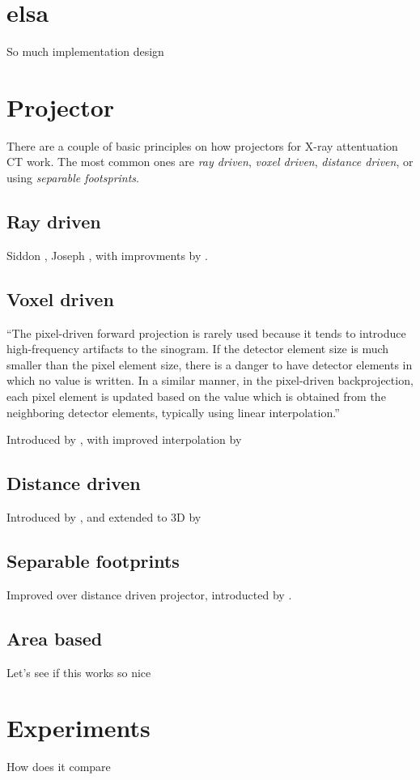 \chapter{elsa}

So much implementation design

\chapter{Projector}

There are a couple of basic principles on how projectors for X-ray attentuation CT work.
The most common ones are \textit{ray driven}, \textit{voxel driven}, \textit{distance driven},
or using \textit{separable footsprints}.


\section{Ray driven}
 
Siddon \cite{siddon_fast_1985}, Joseph \cite{joseph_improved_1982}, with improvments
by \cite{jacobs_fast_1998,christiaens_fast_1999,zhao_fast_2004,gao_fast_2012}.

\section{Voxel driven}

\enquote{The pixel-driven forward projection is rarely used because it tends to introduce
high-frequency artifacts to the sinogram. If the detector element size is much smaller than the
pixel element size, there is a danger to have detector elements in which no value is written. In a
similar manner, in the pixel-driven backprojection, each pixel element is updated based on the value
which is obtained from the neighboring detector elements, typically using linear interpolation.}
\cite{levakhina_three-dimensional_2014}

Introduced by \cite{peters_algorithms_1981}, with improved interpolation by \cite{harauz_interpolation_1983}

\section{Distance driven}
 
Introduced by \cite{de_man_distance-driven_2002}, and extended to 3D by \cite{de_man_distance-driven_2004}

\section{Separable footprints}

Improved over distance driven projector, introducted by \cite{long_3d_2010} \cite{long_3d_nodate}.

\section{Area based}

Let's see if this works
\cite{ha_look-up_2018,ha_efficient_2016,ha_study_2015}
so nice 


\chapter{Experiments}

How does it compare

